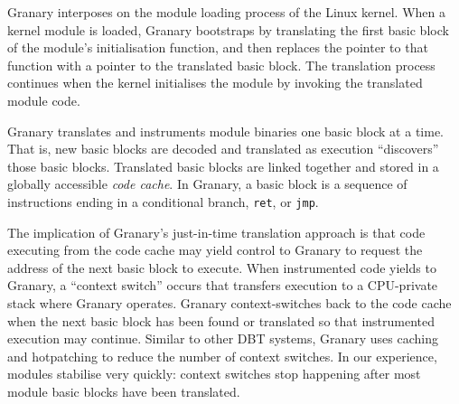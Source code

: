 \documentclass[preprint]{sigplanconf}
\begin{document}



Granary interposes on the module loading process of the Linux kernel. When a kernel module is loaded, Granary bootstraps by translating the first basic block of the module's initialisation function, and then replaces the pointer to that function with a pointer to the translated basic block. The translation process continues when the kernel initialises the module by invoking the translated module code.

Granary translates and instruments module binaries one basic block at a time. That is, new basic blocks are decoded and translated as execution ``discovers'' those basic blocks. Translated basic blocks are linked together and stored in a globally accessible \emph{code cache}. In Granary, a basic block is a sequence of instructions ending in a conditional branch, \texttt{ret}, or \texttt{jmp}.

The implication of Granary's just-in-time translation approach is that code executing from the code cache may yield control to Granary to request the address of the next basic block to execute. When instrumented code yields to Granary, a ``context switch'' occurs that transfers execution to a CPU-private stack where Granary operates. Granary context-switches back to the code cache when the next basic block has been found or translated so that instrumented execution may continue. Similar to other DBT systems, Granary uses caching and hotpatching to reduce the number of context switches. In our experience, modules stabilise very quickly: context switches stop happening after most module basic blocks have been translated.
\end{document}
